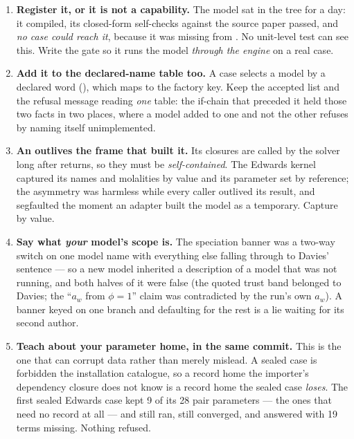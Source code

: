 \documentclass[11pt,a4paper]{article}
\begin{document}
\begin{enumerate}[leftmargin=*]
  \item \textbf{Register it, or it is not a capability.}  The model sat in
        the tree for a day: it compiled, its closed-form self-checks against
        the source paper passed, and \emph{no case could reach it}, because
        it was missing from .  No
        unit-level test can see this.  Write the gate so it runs the model
        \emph{through the engine} on a real case.

  \item \textbf{Add it to the declared-name table too.}  A case selects a
        model by a declared word (), which
         maps to the factory key.  Keep
        the accepted list and the refusal message reading \emph{one} table:
        the if-chain that preceded it held those two facts in two places,
        where a model added to one and not the other refuses by naming
        itself unimplemented.

  \item \textbf{An  outlives the frame that built
        it.}  Its closures are called by the solver long after
         returns, so they must be \emph{self-contained}.
        The Edwards kernel captured its names and molalities by value and
        its parameter set by reference; the asymmetry was harmless while
        every caller outlived its result, and segfaulted the moment an
        adapter built the model as a temporary.  Capture by value.

  \item \textbf{Say what \emph{your} model's scope is.}  The speciation
        banner was a two-way switch on one model name with everything else
        falling through to Davies' sentence --- so a new model inherited a
        description of a model that was not running, and both halves of it
        were false (the quoted trust band belonged to Davies; the ``$a_w$
        from $\phi = 1$'' claim was contradicted by the run's own $a_w$).
        A banner keyed on one branch and defaulting for the rest is a lie
        waiting for its second author.

  \item \textbf{Teach  about your parameter home,
        in the same commit.}  This is the one that can corrupt data rather
        than merely mislead.  A sealed case is forbidden the installation
        catalogue, so a record home the importer's dependency closure does
        not know is a record home the sealed case \emph{loses}.  The first
        sealed Edwards case kept 9 of its 28 pair parameters --- the ones
        that need no record at all --- and still ran, still converged, and
        answered with 19 terms missing.  Nothing refused.
\end{enumerate}
\end{document}
